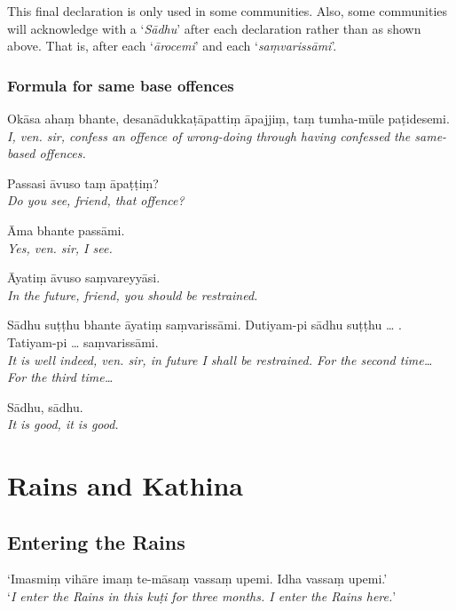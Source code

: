 This final declaration is only used in some communities. Also, some communities
will acknowledge with a ‘\emph{Sādhu}’ after each declaration rather than as
shown above. That is, after each ‘\emph{ārocemi}’ and each
‘\emph{saṃvarissāmi}’.

\subsubsection{Formula for same base offences}

\hangindent=25pt%
\parbox{22pt}{} Okāsa ahaṃ bhante, desanādukkaṭāpattiṃ āpajjiṃ, taṃ tumha-mūle paṭidesemi.\\ \emph{I, ven. sir, confess an offence of wrong-doing through having confessed the same-based offences.}

\hangindent=25pt%
\parbox{22pt}{} Passasi āvuso taṃ āpaṭṭiṃ?\\ \emph{Do you see, friend, that offence?}

\hangindent=25pt%
\parbox{22pt}{} Āma bhante passāmi.\\ \emph{Yes, ven. sir, I see.}

\hangindent=25pt%
\parbox{22pt}{} Āyatiṃ āvuso saṃvareyyāsi.\\ \emph{In the future, friend, you should be restrained.}

\hangindent=25pt%
\parbox{22pt}{} Sādhu suṭṭhu bhante āyatiṃ saṃvarissāmi. Dutiyam-pi sādhu suṭṭhu … . Tatiyam-pi … saṃvarissāmi.\\ \emph{It is well indeed, ven. sir, in future I shall be restrained. For the second time… For the third time…}

\hangindent=25pt%
\parbox{22pt}{} Sādhu, sādhu.\\ \emph{It is good, it is good.} 

\section{Rains and Kathina}

\subsection{Entering the Rains}

‘Imasmiṃ vihāre imaṃ te-māsaṃ vassaṃ upemi. Idha vassaṃ upemi.’\\
‘\emph{I enter the Rains in this kuṭi for three months. I enter the Rains
  here.}’

